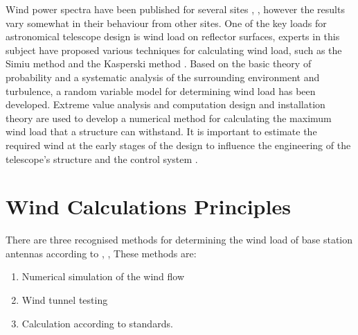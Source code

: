 {Wind power spectra have been  published for several sites \cite{hiriart2001wind}, \cite{forbes1982wind}, however the results vary somewhat in their behaviour from other sites. One of the key loads for astronomical telescope design is wind load on reflector surfaces, experts in this subject have proposed various techniques for calculating wind load, such as the Simiu method and the Kasperski method \cite{ye2021research}. Based on the basic theory of probability and a systematic analysis of the surrounding environment and turbulence, a random variable model for determining wind load has been developed. Extreme value analysis and computation design and installation theory are used to develop a numerical method  for calculating the maximum wind load that a structure can withstand.
It is important to estimate the required wind at the early stages of the design to influence the engineering of the telescope's structure and the control system \cite{macmynowski2006wind,odinets2018analysis}.




\section{Wind Calculations Principles}

There are three recognised methods for determining the wind load of base station antennas according to \cite{bsi2005bs}, \cite{en19911} \cite{fournier2019recommendation} \cite{ kathrein_2016}, \cite{alliance2020recommendation} These methods are: 
\begin{enumerate}
    \item 
Numerical simulation of the wind flow
\item 
Wind tunnel testing 
\item
Calculation according to standards.
\end{enumerate}

}
